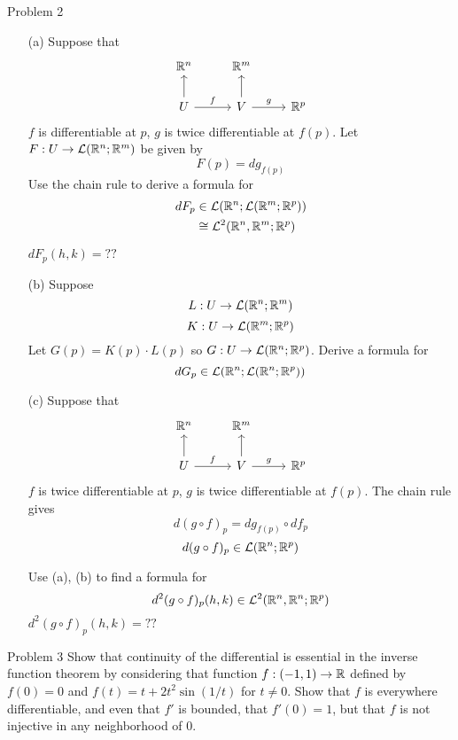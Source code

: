 \documentclass{hmwk}
\begin{document}
\begin{problem}{Problem 2}
\begin{itemize}
    \item[(a)] Suppose that 
\[\begin{tikzcd}
{\R^n} & {\R^m} \\
U & V & {\R^p}
\arrow[from=2-1, to=1-1]
\arrow["f", from=2-1, to=2-2]
\arrow[from=2-2, to=1-2]
\arrow["g", from=2-2, to=2-3]
\end{tikzcd}\]
$f$ is differentiable at $p$, $g$ is twice differentiable at $f(p)$. 
Let $F:U \rightarrow \mathcal{L}(\mathbb{R}^n; \mathbb{R}^m)$ be given by $$F(p) = dg_{f(p)}$$
Use the chain rule to derive a formula for \begin{align*}
    dF_p &\in \mathcal{L}(\mathbb{R}^n; \mathcal{L}(\mathbb{R}^m; \mathbb{R}^p)) \\
    &\cong \mathcal{L}^2(\mathbb{R}^n, \mathbb{R}^m; \mathbb{R}^p)
\end{align*} 

$dF_p(h, k) = ??$
\item[(b)] Suppose 
$$L: U \rightarrow \mathcal{L}(\mathbb{R}^n; \mathbb{R}^m)$$
$$K: U \rightarrow \mathcal{L}(\mathbb{R}^m; \mathbb{R}^p)$$
Let $G(p) = K(p) \cdot L(p)$ so $G: U \rightarrow \mathcal{L}(\mathbb{R}^n; \mathbb{R}^p)$.
Derive a formula for $$dG_p \in \mathcal{L}(\mathbb{R}^n; \mathcal{L}(\mathbb{R}^n; \mathbb{R}^p))$$

\item[(c)] Suppose that 
\[\begin{tikzcd}
{\R^n} & {\R^m} \\
U & V & {\R^p}
\arrow[from=2-1, to=1-1]
\arrow["f", from=2-1, to=2-2]
\arrow[from=2-2, to=1-2]
\arrow["g", from=2-2, to=2-3]
\end{tikzcd}\]
$f$ is twice differentiable at $p$, $g$ is twice differentiable at $f(p)$. The chain rule gives 
$$d(g \circ f)_p = dg_{f(p)} \circ df_p$$
$$d(g \circ f)_p \in \mathcal{L}(\mathbb{R}^n; \mathbb{R}^p)$$

Use (a), (b) to find a formula for $$d^2(g \circ f)_p(h, k) \in \mathcal{L}^2(\mathbb{R}^n, \mathbb{R}^n; \mathbb{R}^p)$$
$d^2(g \circ f)_p(h, k) = ??$
\end{itemize}
\end{problem}

\begin{solution}
    
\end{solution}

\begin{problem}{Problem 3}
Show that continuity of the differential is essential in the inverse function theorem by considering that function $f: (-1, 1) \rightarrow \mathbb{R}$ defined by $f(0) = 0$ and $f(t) = t + 2t^2\sin(1/t)$ for $t \neq 0$. Show that $f$ is everywhere differentiable, and even that $f'$ is bounded, that $f'(0) = 1$, but that $f$ is not injective in any neighborhood of $0$.
\end{problem}
\end{document}
